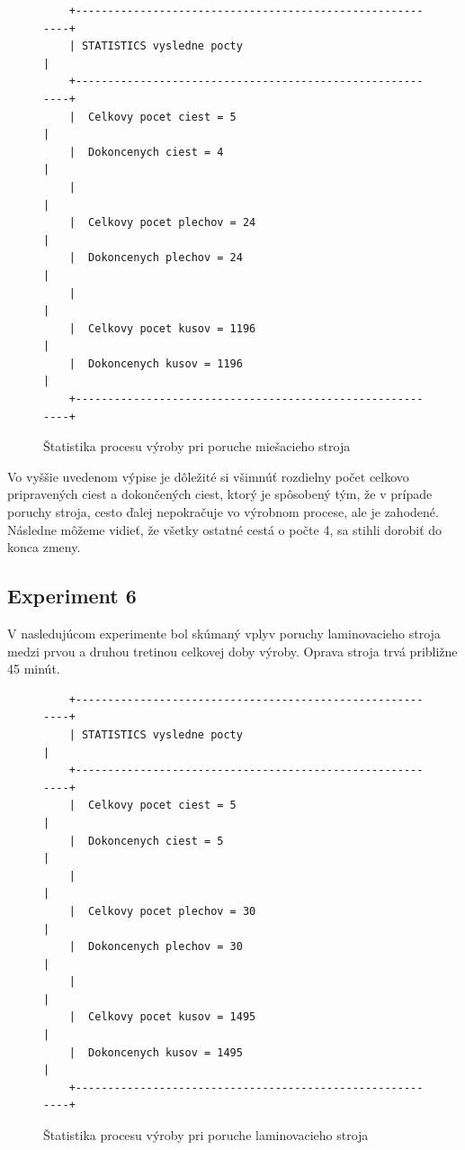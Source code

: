 \documentclass[11pt]{article}
\begin{document}
\begin{figure}[H]
\begin{verbatim}
    +----------------------------------------------------------+
    | STATISTICS vysledne pocty                                |
    +----------------------------------------------------------+
    |  Celkovy pocet ciest = 5                                 |
    |  Dokoncenych ciest = 4                                   |
    |                                                          |
    |  Celkovy pocet plechov = 24                              |
    |  Dokoncenych plechov = 24                                |
    |                                                          |
    |  Celkovy pocet kusov = 1196                              |
    |  Dokoncenych kusov = 1196                                |
    +----------------------------------------------------------+
\end{verbatim}
\caption{Štatistika procesu výroby pri poruche miešacieho stroja}
\label{fig:mixer_failure_experiment}
\end{figure}

Vo vyššie uvedenom výpise je dôležité si všimnúť rozdielny počet celkovo pripravených ciest a dokončených ciest, ktorý je spôsobený tým, že v prípade poruchy stroja, cesto ďalej nepokračuje vo výrobnom procese, ale je zahodené. Následne môžeme vidieť, že všetky ostatné cestá o počte 4, sa stihli dorobiť do konca zmeny.

\subsection{Experiment 6}
\label{exp:shaper_failure_experiment}
V nasledujúcom experimente bol skúmaný vplyv poruchy laminovacieho stroja medzi prvou a druhou tretinou celkovej doby výroby. Oprava stroja trvá približne 45 minút.

\begin{figure}[H]
\begin{verbatim}
    +----------------------------------------------------------+
    | STATISTICS vysledne pocty                                |
    +----------------------------------------------------------+
    |  Celkovy pocet ciest = 5                                 |
    |  Dokoncenych ciest = 5                                   |
    |                                                          |
    |  Celkovy pocet plechov = 30                              |
    |  Dokoncenych plechov = 30                                |
    |                                                          |
    |  Celkovy pocet kusov = 1495                              |
    |  Dokoncenych kusov = 1495                                |
    +----------------------------------------------------------+
\end{verbatim}
\caption{Štatistika procesu výroby pri poruche laminovacieho stroja}
\label{fig:mixer_failure_experiment}
\end{figure}
\end{document}
